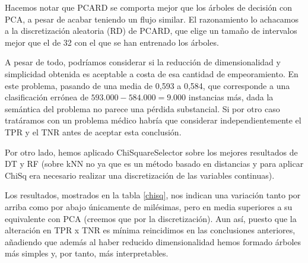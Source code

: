 Hacemos notar que PCARD se comporta mejor que los árboles de decisión con PCA, a pesar de acabar teniendo un flujo similar. El razonamiento lo achacamos a la discretización aleatoria (RD) de PCARD, que elige un tamaño de intervalos mejor que el de 32 con el que se han entrenado los árboles.

\vspace{\baselineskip}

A pesar de todo, podríamos considerar si la reducción de dimensionalidad y simplicidad obtenida es aceptable a costa de esa cantidad de empeoramiento. En este problema, pasando de una media de 0,593 a 0,584, que corresponde a una clasificación errónea de $593.000 - 584.000 = 9.000$ instancias más, dada la semántica del problema no parece una pérdida substancial. Si por otro caso tratáramos con un problema médico habría que considerar independientemente el TPR y el TNR antes de aceptar esta conclusión.

\vspace{\baselineskip}

Por otro lado, hemos aplicado ChiSquareSelector sobre los mejores resultados de DT y RF (sobre kNN no ya que es un método basado en distancias y para aplicar ChiSq era necesario realizar una discretización de las variables continuas). 

Los resultados, mostrados en la tabla \ref{chisq}, nos indican una variación tanto por arriba como por abajo únicamente de milésimas, pero en media superiores a su equivalente con PCA (creemos que por la discretización). Aun así, puesto que la alteración en TPR x TNR es mínima reincidimos en las conclusiones anteriores, añadiendo que además al haber reducido dimensionalidad hemos formado árboles más simples y, por tanto, más interpretables.

\vspace{\baselineskip}

